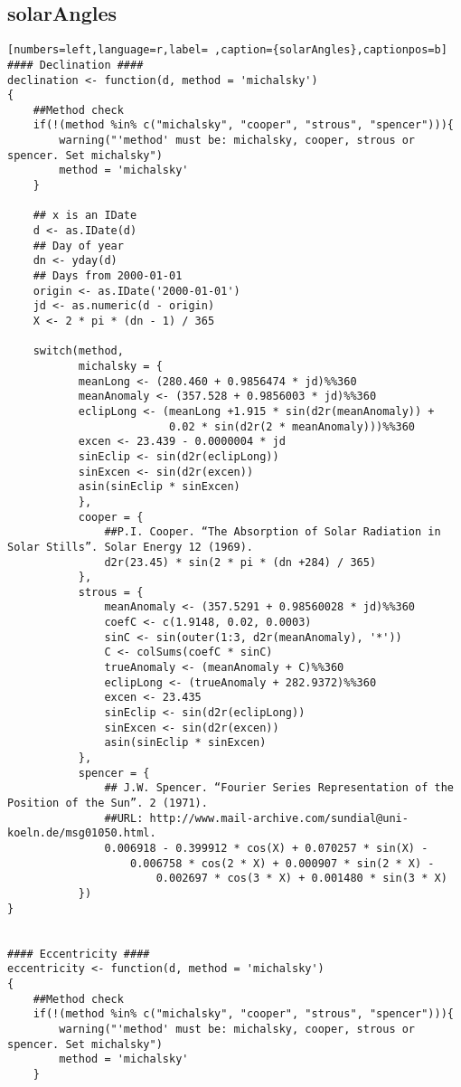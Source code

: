 \subsection{solarAngles}
\label{sec:orgb6dd677}
\begin{lstlisting}[numbers=left,language=r,label= ,caption={solarAngles},captionpos=b]
#### Declination ####
declination <- function(d, method = 'michalsky')
{
    ##Method check
    if(!(method %in% c("michalsky", "cooper", "strous", "spencer"))){
        warning("'method' must be: michalsky, cooper, strous or spencer. Set michalsky")
        method = 'michalsky'
    }

    ## x is an IDate
    d <- as.IDate(d)
    ## Day of year
    dn <- yday(d)
    ## Days from 2000-01-01
    origin <- as.IDate('2000-01-01')
    jd <- as.numeric(d - origin)
    X <- 2 * pi * (dn - 1) / 365

    switch(method,
           michalsky = {
           meanLong <- (280.460 + 0.9856474 * jd)%%360
           meanAnomaly <- (357.528 + 0.9856003 * jd)%%360
           eclipLong <- (meanLong +1.915 * sin(d2r(meanAnomaly)) +
                         0.02 * sin(d2r(2 * meanAnomaly)))%%360
           excen <- 23.439 - 0.0000004 * jd
           sinEclip <- sin(d2r(eclipLong))
           sinExcen <- sin(d2r(excen))
           asin(sinEclip * sinExcen)
           },
           cooper = {
               ##P.I. Cooper. “The Absorption of Solar Radiation in Solar Stills”. Solar Energy 12 (1969).
               d2r(23.45) * sin(2 * pi * (dn +284) / 365)
           },
           strous = {
               meanAnomaly <- (357.5291 + 0.98560028 * jd)%%360
               coefC <- c(1.9148, 0.02, 0.0003)
               sinC <- sin(outer(1:3, d2r(meanAnomaly), '*'))
               C <- colSums(coefC * sinC)
               trueAnomaly <- (meanAnomaly + C)%%360
               eclipLong <- (trueAnomaly + 282.9372)%%360
               excen <- 23.435
               sinEclip <- sin(d2r(eclipLong))
               sinExcen <- sin(d2r(excen))
               asin(sinEclip * sinExcen)
           },
           spencer = {
               ## J.W. Spencer. “Fourier Series Representation of the Position of the Sun”. 2 (1971).
               ##URL: http://www.mail-archive.com/sundial@uni-koeln.de/msg01050.html.
               0.006918 - 0.399912 * cos(X) + 0.070257 * sin(X) -
                   0.006758 * cos(2 * X) + 0.000907 * sin(2 * X) -
                       0.002697 * cos(3 * X) + 0.001480 * sin(3 * X)           
           })
}


#### Eccentricity ####
eccentricity <- function(d, method = 'michalsky')
{
    ##Method check
    if(!(method %in% c("michalsky", "cooper", "strous", "spencer"))){
        warning("'method' must be: michalsky, cooper, strous or spencer. Set michalsky")
        method = 'michalsky'
    }


\end{lstlisting}
